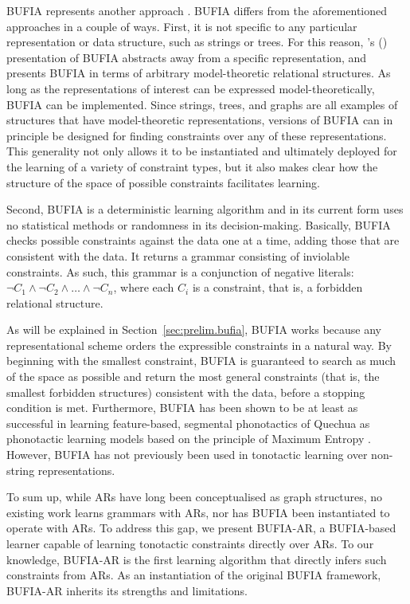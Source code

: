 \documentclass{CUP-JNL-PHO}%
\theoremstyle{definition}
\numberwithin{equation}{section}
\theoremstyle{definition}
\begin{document}
BUFIA represents another approach \citep{chandleeBufia2019, rawski2021structure}.
BUFIA differs from the aforementioned approaches in a couple of ways. First,
it is not specific to any particular representation or data structure,
such as strings or trees. For this reason,
\citeauthor{chandleeBufia2019}'s (\citeyear{chandleeBufia2019})
presentation of BUFIA abstracts away from a specific representation,
and presents BUFIA in terms of arbitrary model-theoretic relational
structures. As long as the representations of interest can be
expressed model-theoretically, BUFIA can be implemented. %
Since strings, trees, and graphs are all examples of structures that
have model-theoretic representations, versions of BUFIA can in
principle be designed for finding constraints over any of these
representations. This generality not only allows it to be
instantiated and ultimately deployed for the learning of a variety of
constraint types, but it also makes clear how the structure of the
space of possible constraints facilitates learning.

Second, BUFIA is a deterministic learning algorithm and in its current
form uses no statistical methods or randomness in its decision-making.
Basically, BUFIA checks possible constraints against the data one at a
time, adding those that are consistent with the data. It returns a
grammar consisting of inviolable constraints. As such, this grammar is
a conjunction of negative literals:
$\lnot C_1 \land \lnot C_2 \land \ldots \land \lnot C_n$, where each
\(C_i\) is a constraint, that is, a forbidden relational structure.

As will be explained in Section~\ref{sec:prelim.bufia}, BUFIA works because
any representational scheme orders the expressible constraints in a
natural way. By beginning with the smallest constraint, BUFIA is
guaranteed to search as much of the space as possible and return the
most general constraints (that is, the smallest forbidden structures)
consistent with the data, before a stopping condition is
met. Furthermore, BUFIA has been shown to be at least as successful in
learning feature-based, segmental phonotactics of Quechua
\citep{Swanson+2025} as phonotactic learning models based on the
principle of Maximum Entropy \citep{hayes2008maximum,
	wilson2018accidental}. However, BUFIA has not previously been used
in tonotactic learning over non-string representations.

To sum up, while ARs have long been conceptualised as graph
structures, no existing work learns grammars with ARs, nor has BUFIA
been instantiated to operate with ARs. To address this gap, we
present BUFIA-AR, a BUFIA-based learner capable of learning tonotactic
constraints directly over ARs. To our knowledge, BUFIA-AR is the first
learning algorithm that directly infers such constraints from ARs. As
an instantiation of the original BUFIA framework, BUFIA-AR inherits
its strengths and limitations.
\end{document}
